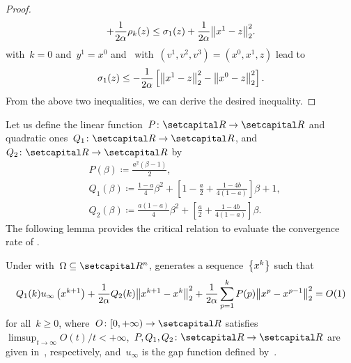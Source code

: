 \documentclass[../main]{subfiles}
\begin{document}
\begin{proof}
\begin{multline}
        + \frac{1}{2 \alpha} \rho_k(z)
        \le \sigma_1(z) + \frac{1}{2 \alpha} \norm*{x^1 - z}_2^2
    .\end{multline}
     with~$k = 0$ and~$y^1 = x^0$ and~ with~$(v^1, v^2, v^3) = (x^0, x^1, z)$ lead to
    \begin{equation}
        \sigma_1(z) \le - \frac{1}{2 \alpha} \left[ \norm*{x^1 - z}_2^2 - \norm*{x^0 - z}_2^2 \right]
    .\end{equation}
    From the above two inequalities, we can derive the desired inequality.
\end{proof}

Let us define the linear function~$P \colon \setR \to \setR$ and quadratic ones~$Q_1 \colon \setR \to \setR$, and~$Q_2 \colon \setR \to \setR$ by
\begin{equation} \label{eq:P Q}
    \begin{aligned}
    &P(\beta) \coloneqq \frac{a^2 (\beta - 1)}{2},\\
    &Q_1(\beta) \coloneqq \frac{1 - a}{4} \beta^2 + \left[ 1 - \frac{a}{2} + \frac{1 - 4 b}{4 (1 - a)} \right] \beta + 1,\\
    &Q_2(\beta) \coloneqq \frac{a (1 - a)}{4} \beta^2 + \left[ \frac{a}{2} + \frac{1 - 4 b}{4 (1 - a)} \right] \beta
    .\end{aligned}
\end{equation}
The following lemma provides the critical relation to evaluate the convergence rate of .
\begin{lemma} 
    Under  with~$\Omega \subseteq \setR^n$,  generates a sequence~$\set*{x^k}$ such that
    \begin{equation}
        Q_1(k) u_\infty\left(x^{k + 1}\right) + \frac{1}{2 \alpha} Q_2(k) \norm*{x^{k + 1} - x^k}_2^2 + \frac{1}{2 \alpha} \sum_{p = 1}^{k} P(p) \norm*{x^p - x^{p - 1}}_2^2 = O(1)
    \end{equation}
    for all~$k \ge 0$, where~$O \colon [0, +\infty) \to \setR$ satisfies~$\limsup_{t \to \infty} O(t) / t < + \infty$,~$P, Q_1, Q_2 \colon \setR \to \setR$ are given in~, respectively, and~$u_\infty$ is the gap function defined by~.
\end{lemma}
\end{document}
